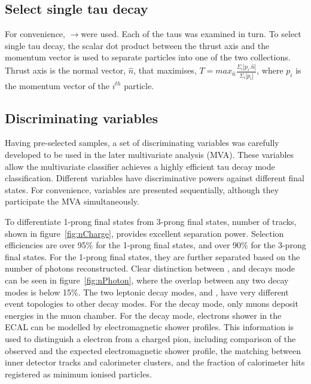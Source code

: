 \documentclass[a4paper,11pt]{article}
\newcommand{\decayElectron}{\Pem\PAGne\PGnGt}
\newcommand{\decayMuon}{\PGmm\PAGnGm\PGnGt}
\newcommand{\decayPion}{\PGpm\PGnGt}
\newcommand{\decayRho}{\PGrP{\PGpm\PGpz}\PGnGt}
\newcommand{\decayAiPhoton}{\PaDoP{\PGpm\PGpz\PGpz}\PGnGt}
\newcommand{\eeToTauTau}{\Pep\Pem$\to$\PGtp\PGtm}
\begin{document}

\subsection{Select single tau decay}

For convenience, \eeToTauTau were used. Each of the taus was examined in turn. To select single tau decay, the scalar  dot product between the thrust axis and the momentum vector is used to separate particles into one of the two collections. Thrust axis is the normal vector, $\hat{n}$, that maximises, $T = max_{\hat{n}} \frac {\Sigma_{i} \left| p_i . \hat{n} \right|}{\Sigma_{i} \left| p_i \right|}$, where $p_i$ is the momentum vector of the $i^{th}$ particle.


\subsection{Discriminating variables}





Having pre-selected samples, a set of discriminating variables was carefully developed to be used in the later multivariate analysis (MVA). These variables allow the multivariate classifier achieves a highly efficient tau decay mode classification. Different variables have discriminative powers against different final states. For convenience, variables are presented sequentially, although they participate the MVA simultaneously.

To differentiate 1-prong final states from 3-prong final states, number of tracks, shown in figure~\ref{fig:nCharge}, provides excellent separation power. Selection efficiencies are over 95\% for the 1-prong final states, and over 90\% for the 3-prong final states. For the 1-prong final states, they are further separated based on the number of photons reconstructed. Clear distinction between \decayPion, \decayRho and \decayAiPhoton decays mode can be seen in figure~\ref{fig:nPhoton}, where the overlap between any two decay modes is below 15\%. The two leptonic decay modes, \decayMuon and \decayElectron, have very different event topologies to other decay modes. For the \decayMuon decay mode, only muons deposit energies in the muon chamber. For the \decayElectron decay mode, electrons shower in the ECAL can be modelled by electromagnetic shower profiles. This information is used to distinguish a electron from a charged pion, including comparison of the observed and the expected electromagnetic shower profile, the matching between inner detector tracks and calorimeter clusters, and the fraction of calorimeter hits registered as minimum ionised particles.
\end{document}
